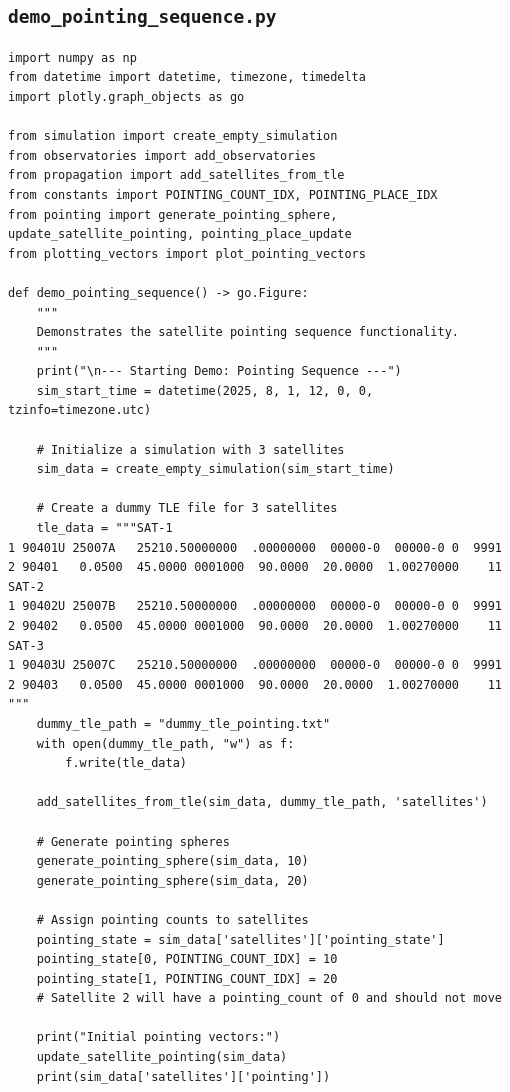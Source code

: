 \documentclass[11pt]{article}
\begin{document}
\subsection{\texttt{demo\_pointing\_sequence.py}}
\begin{Verbatim}
import numpy as np
from datetime import datetime, timezone, timedelta
import plotly.graph_objects as go

from simulation import create_empty_simulation
from observatories import add_observatories
from propagation import add_satellites_from_tle
from constants import POINTING_COUNT_IDX, POINTING_PLACE_IDX
from pointing import generate_pointing_sphere, update_satellite_pointing, pointing_place_update
from plotting_vectors import plot_pointing_vectors

def demo_pointing_sequence() -> go.Figure:
    """
    Demonstrates the satellite pointing sequence functionality.
    """
    print("\n--- Starting Demo: Pointing Sequence ---")
    sim_start_time = datetime(2025, 8, 1, 12, 0, 0, tzinfo=timezone.utc)

    # Initialize a simulation with 3 satellites
    sim_data = create_empty_simulation(sim_start_time)
    
    # Create a dummy TLE file for 3 satellites
    tle_data = """SAT-1
1 90401U 25007A   25210.50000000  .00000000  00000-0  00000-0 0  9991
2 90401   0.0500  45.0000 0001000  90.0000  20.0000  1.00270000    11
SAT-2
1 90402U 25007B   25210.50000000  .00000000  00000-0  00000-0 0  9991
2 90402   0.0500  45.0000 0001000  90.0000  20.0000  1.00270000    11
SAT-3
1 90403U 25007C   25210.50000000  .00000000  00000-0  00000-0 0  9991
2 90403   0.0500  45.0000 0001000  90.0000  20.0000  1.00270000    11
"""
    dummy_tle_path = "dummy_tle_pointing.txt"
    with open(dummy_tle_path, "w") as f:
        f.write(tle_data)

    add_satellites_from_tle(sim_data, dummy_tle_path, 'satellites')

    # Generate pointing spheres
    generate_pointing_sphere(sim_data, 10)
    generate_pointing_sphere(sim_data, 20)

    # Assign pointing counts to satellites
    pointing_state = sim_data['satellites']['pointing_state']
    pointing_state[0, POINTING_COUNT_IDX] = 10
    pointing_state[1, POINTING_COUNT_IDX] = 20
    # Satellite 2 will have a pointing_count of 0 and should not move

    print("Initial pointing vectors:")
    update_satellite_pointing(sim_data)
    print(sim_data['satellites']['pointing'])


\end{Verbatim}
\end{document}
